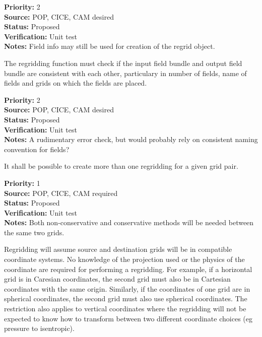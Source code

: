 \begin{reqlist}
{\bf Priority:} 2 \\
{\bf Source:} POP, CICE, CAM desired \\
{\bf Status:} Proposed \\
{\bf Verification:} Unit test \\
{\bf Notes:} Field info may still be used for creation of the
             regrid object.
\end{reqlist}


The regridding function must check if the input field bundle and output field
bundle are consistent with each other, particulary in number of fields, name of
fields and grids on which the fields are placed.

\begin{reqlist}
{\bf Priority:} 2 \\
{\bf Source:} POP, CICE, CAM desired \\
{\bf Status:} Proposed \\
{\bf Verification:} Unit test \\
{\bf Notes:} A rudimentary error check, but would probably rely on
             consistent naming convention for fields?
\end{reqlist}


It shall be possible to create more than one regridding for a given grid
pair.

\begin{reqlist}
{\bf Priority:} 1 \\
{\bf Source:} POP, CICE, CAM required \\
{\bf Status:} Proposed \\
{\bf Verification:} Unit test \\
{\bf Notes:} Both non-conservative and conservative methods will be needed
             between the same two grids.
\end{reqlist}


Regridding will assume source and destination grids will be
in compatible coordinate systems.  No knowledge of
the projection used or the physics of the coordinate are
required for performing a regridding.  For example, if a 
horizontal grid is in Caresian coordinates, the second grid 
must also be in Cartesian coordinates with the same origin.
Similarly, if the coordinates of one grid are in spherical 
coordinates, the second grid must also use spherical 
coordinates.  The restriction
also applies to vertical coordinates where the regridding
will not be expected to know how to transform between
two different coordinate choices (eg pressure to isentropic).

